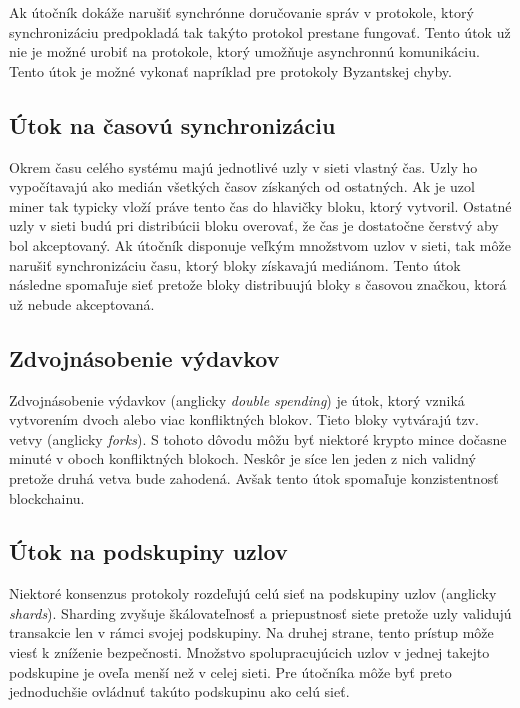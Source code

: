 Ak útočník dokáže narušiť synchrónne doručovanie správ v protokole, ktorý synchronizáciu predpokladá tak takýto protokol prestane fungovať. Tento útok už nie je možné urobiť na protokole, ktorý umožňuje asynchronnú komunikáciu. Tento útok je možné vykonať napríklad pre protokoly Byzantskej chyby.~\cite{homoliakBlockchain}

\subsection{Útok na časovú synchronizáciu}
Okrem času celého systému majú jednotlivé uzly v sieti vlastný čas. Uzly ho vypočítavajú ako medián všetkých časov získaných od ostatných. Ak je uzol miner tak typicky vloží práve tento čas do hlavičky bloku, ktorý vytvoril. Ostatné uzly v sieti budú pri distribúcii bloku overovať, že čas je dostatočne čerstvý aby bol akceptovaný. Ak útočník disponuje veľkým množstvom uzlov v sieti, tak môže narušiť synchronizáciu času, ktorý bloky získavajú mediánom. Tento útok následne spomaľuje sieť pretože bloky distribuujú bloky s časovou značkou, ktorá už nebude akceptovaná.

\subsection{Zdvojnásobenie výdavkov}

Zdvojnásobenie výdavkov (anglicky \textit{double spending}) je útok, ktorý vzniká vytvorením dvoch alebo viac konfliktných blokov. Tieto bloky vytvárajú tzv. vetvy (anglicky \textit{forks}). S tohoto dôvodu môžu byť niektoré krypto mince dočasne minuté v oboch konfliktných blokoch. Neskôr je síce len jeden z nich validný pretože druhá vetva bude zahodená. Avšak tento útok spomaľuje konzistentnosť blockchainu.

\subsection{Útok na podskupiny uzlov}\label{subsec:shard-attack}

Niektoré konsenzus protokoly rozdeľujú celú sieť na podskupiny uzlov (anglicky \textit{shards}). Sharding zvyšuje škálovateľnosť a priepustnosť siete pretože uzly validujú transakcie len v rámci svojej podskupiny. Na druhej strane, tento prístup môže viesť k zníženie bezpečnosti. Množstvo spolupracujúcich uzlov v jednej takejto podskupine je oveľa menší než v celej sieti. Pre útočníka môže byť preto jednoduchšie ovládnuť takúto podskupinu ako celú sieť.

